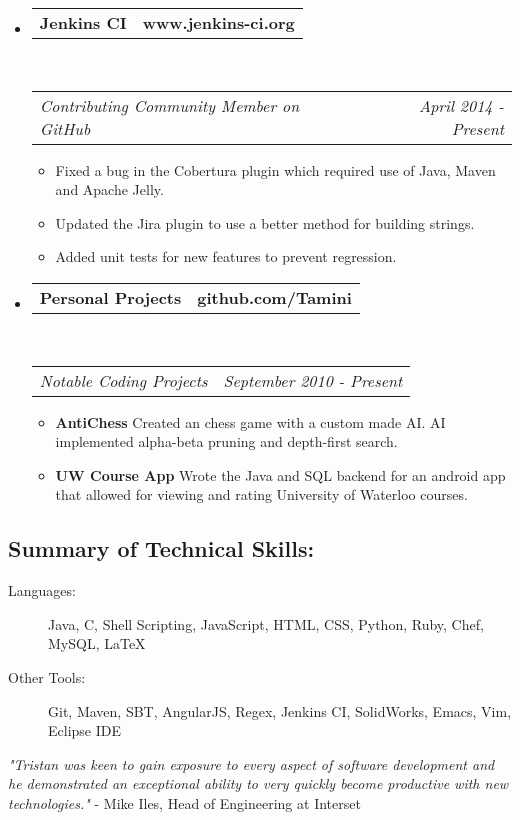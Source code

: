 \documentclass[11pt]{article} %
\makeatletter
\newcommand{\CPP}
{C\nolinebreak[4]\hspace{-.05em}\raisebox{.22ex}{\footnotesize\bf ++}}
\newcommand{\headerrow}[2]
{\begin{tabular*}{\linewidth}{l@{\extracolsep{\fill}}r}
	#1 &
	#2 \\
\end{tabular*}}
\makeatother
\begin{document}
\begin{itemize}[leftmargin=-0.5em, label={}]
	\item
	\headerrow
		{\textbf{Jenkins CI}}
		{\textbf{www.jenkins-ci.org}}
	\\
	\headerrow
		{\emph{Contributing Community Member on GitHub}}
		{\emph{April 2014 - Present}}
	\begin{itemize}
		\item Fixed a bug in the Cobertura plugin which required use of Java, Maven and Apache Jelly.
		\item Updated the Jira plugin to use a better method for building strings.
		\item Added unit tests for new features to prevent regression. 
	\end{itemize}

	\item
	\headerrow
		{\textbf{Personal Projects}}
		{\textbf{github.com/Tamini}}
	\\
	\headerrow
		{\emph{Notable Coding Projects}}
		{\emph{September 2010 - Present}}
	\begin{itemize}
		\item {\bf AntiChess} Created an chess game with a custom made AI. AI implemented alpha-beta pruning and depth-first search.
		\item {\bf UW Course App} Wrote the Java and SQL backend for an android app that allowed for viewing and rating University of Waterloo courses.
	\end{itemize}

\end{itemize}
\subsection*{Summary of Technical Skills:}
\begin{description}
	\item[Languages:] Java, \CPP, Shell Scripting, JavaScript, HTML, CSS, Python, Ruby, Chef, MySQL, \LaTeX\
	\item[Other Tools:] Git, Maven, SBT, AngularJS, Regex, Jenkins CI, SolidWorks, Emacs, Vim, Eclipse IDE
\end{description}
\begin{center}

\textit{\newline "Tristan was keen to gain exposure to every aspect of software development and he demonstrated an exceptional ability to very quickly become productive with new technologies." \newline
}
- Mike Iles, Head of Engineering at Interset
\end{center}
\end{document}
